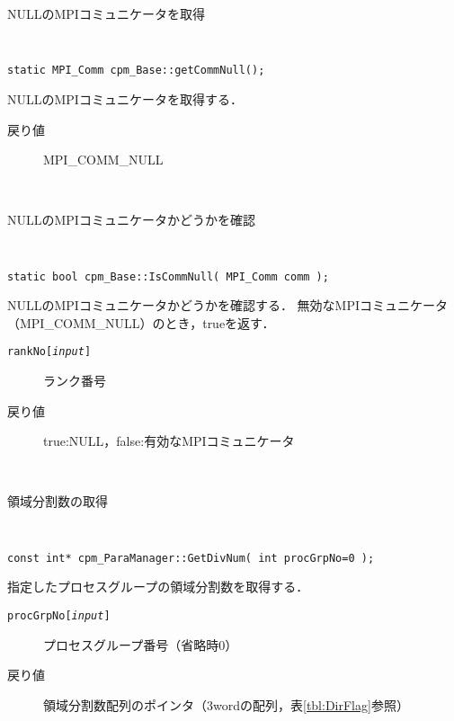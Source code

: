 \begin{spacing}{0.8}
\begin{itembox}[l]{NULLのMPIコミュニケータを取得}
{\tt
\begin{verbatim}
static MPI_Comm cpm_Base::getCommNull();
\end{verbatim}
}
NULLのMPIコミュニケータを取得する．
\begin{description}
\item[戻り値] MPI\_COMM\_NULL
\end{description}
\end{itembox}\\
\end{spacing}

\begin{spacing}{0.8}
\begin{itembox}[l]{NULLのMPIコミュニケータかどうかを確認}
{\tt
\begin{verbatim}
static bool cpm_Base::IsCommNull( MPI_Comm comm );
\end{verbatim}
}
NULLのMPIコミュニケータかどうかを確認する．
無効なMPIコミュニケータ（MPI\_COMM\_NULL）のとき，trueを返す．
\begin{description}
\item[{\tt rankNo[{\it input}]}] ランク番号
\\
\item[戻り値] true:NULL，false:有効なMPIコミュニケータ
\end{description}
\end{itembox}\\
\end{spacing}

\begin{spacing}{0.8}
\begin{itembox}[l]{領域分割数の取得}
{\tt
\begin{verbatim}
const int* cpm_ParaManager::GetDivNum( int procGrpNo=0 );
\end{verbatim}
}
指定したプロセスグループの領域分割数を取得する．
\begin{description}
\item[{\tt procGrpNo[{\it input}]}] プロセスグループ番号（省略時0）
\\
\item[戻り値] 領域分割数配列のポインタ（3wordの配列，表\ref{tbl:DirFlag}参照）
\end{description}
\end{itembox}\\
\end{spacing}

